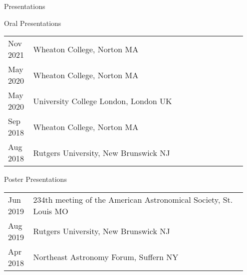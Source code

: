 \documentclass{resume} %
\newcommand{\tab}[1]{\hspace{.2667\textwidth}\rlap{#1}}
\newcommand{\itab}[1]{\hspace{0em}\rlap{#1}}
\begin{document}



\begin{rSection}{Presentations}
\begin{rSubsection}{Oral Presentations}{}{}{}
    \begin{table}[h!]
\begin{tabular}{p{0.1\linewidth} p{0.85\linewidth}}
Nov 2021 & Wheaton College, Norton MA\\
May 2020 & Wheaton College, Norton MA\\ 
May 2020 & University College London, London UK\\
Sep 2018 & Wheaton College, Norton MA\\
Aug 2018 & Rutgers University, New Brunswick NJ\\
\end{tabular}
\end{table}
\end{rSubsection}
\begin{rSubsection}{Poster Presentations}{}{}{}
     \begin{table}[h!]
        \begin{tabular}{p{0.1\linewidth} p{0.85\linewidth}}
        Jun 2019 & 234th meeting of the American Astronomical Society, St. Louis MO\\
        Aug 2019 & Rutgers University, New Brunswick NJ\\
        Apr 2018 & Northeast Astronomy Forum, Suffern NY\\
        \end{tabular}
        \end{table}
\end{rSubsection}

\end{rSection}
\end{document}
